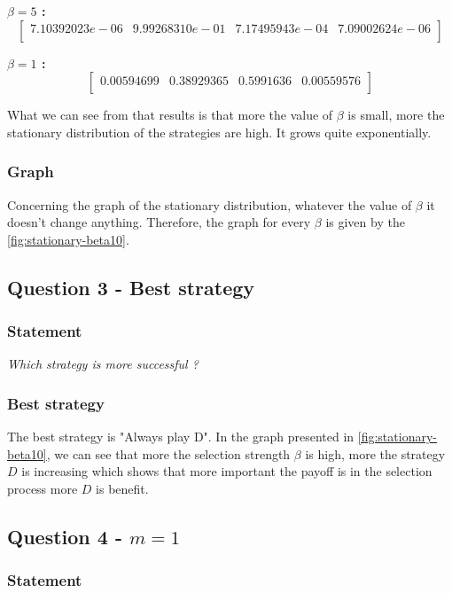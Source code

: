 \documentclass{article}
\begin{document}
\textbf{$\beta = 5$ :} 
$$
\begin{bmatrix} 
 7.10392023e-06 &  9.99268310e-01  & 7.17495943e-04  & 7.09002624e-06 \\
\end{bmatrix}
$$

\textbf{$\beta = 1$ :} 
$$
\begin{bmatrix} 
0.00594699 & 0.38929365 & 0.5991636 &  0.00559576 \\
\end{bmatrix}
$$

What we can see from that results is that more the value of $\beta$ is small, more the stationary distribution of the strategies are high. It grows quite exponentially. 

\subsubsection{Graph}

Concerning the graph of the stationary distribution, whatever the value of $\beta$ it doesn't change anything. Therefore, the graph for every $\beta$ is given by the \autoref{fig:stationary-beta10}.


\subsection{Question 3 - Best strategy}

\subsubsection*{Statement}

\textit{Which strategy is more successful ?}

\subsubsection{Best strategy}

The best strategy is "Always play D". In the graph presented in \autoref{fig:stationary-beta10}, we can see that more the selection strength $\beta$ is high, more the strategy $D$ is increasing which shows that more	important the payoff is	in the selection process more $D$ is benefit. 

\subsection{Question 4 - $m=1$}

\subsubsection*{Statement}
\end{document}
